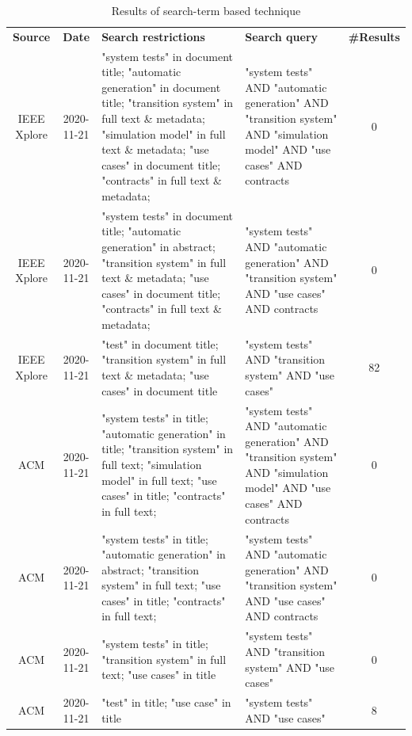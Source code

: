 \begin{small}
	\centering
	\begin{longtable}[h]{c|c|p{}|p{}|c}
		\caption{Results of search-term based technique}\label{search-term}\setlength{\tabcolsep}{1em}\\    %
		\hline
		\textbf{Source} & \textbf{Date} & \textbf{Search restrictions} & \textbf{Search query} & \textbf{\#Results} \\
		\hline
		\hline	
		IEEE Xplore & 2020-11-21 & "system tests" in document title; "automatic generation" in document title; "transition system" in full text \& metadata; "simulation model" in full text \& metadata; "use cases" in document title; "contracts" in full text \& metadata; & "system tests" AND "automatic generation" AND "transition system" AND "simulation model" AND "use cases" AND contracts & 0 \\
		\hline
		IEEE Xplore & 2020-11-21 & "system tests" in document title; "automatic generation" in abstract; "transition system" in full text \& metadata; "use cases" in document title; "contracts" in full text \& metadata; & "system tests" AND "automatic generation" AND "transition system" AND "use cases" AND contracts & 0 \\
		\hline
		IEEE Xplore & 2020-11-21 & "test" in document title; "transition system" in full text \& metadata; "use cases" in document title & "system tests" AND "transition system" AND "use cases" & 82 \\
		\hline
		\hline
		ACM & 2020-11-21 & "system tests" in title; "automatic generation" in title; "transition system" in full text; "simulation model" in full text; "use cases" in title; "contracts" in full text; & "system tests" AND "automatic generation" AND "transition system" AND "simulation model" AND "use cases" AND contracts & 0 \\
		\hline
		ACM & 2020-11-21 & "system tests" in title; "automatic generation" in abstract; "transition system" in full text; "use cases" in title; "contracts" in full text; & "system tests" AND "automatic generation" AND "transition system" AND "use cases" AND contracts & 0 \\
		\hline
		ACM & 2020-11-21 & "system tests" in title; "transition system" in full text; "use cases" in title & "system tests" AND "transition system" AND "use cases" & 0 \\
		\hline
		ACM & 2020-11-21 & "test" in title; "use case" in title & "system tests" AND "use cases" & 8 \\
		\hline
	\end{longtable}
\end{small}


